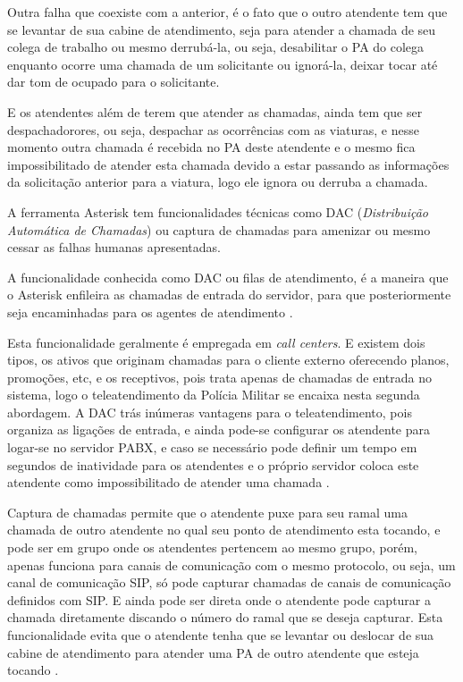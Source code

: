 Outra falha que coexiste com a anterior, é o fato que o outro atendente tem que se levantar de sua cabine de atendimento, seja para atender a chamada de seu colega de trabalho ou mesmo derrubá-la, ou seja, desabilitar o PA do colega enquanto ocorre uma chamada de um solicitante ou ignorá-la, deixar tocar até dar tom de ocupado para o solicitante.

E os atendentes além de terem que atender as chamadas, ainda tem que ser despachadorores, ou seja, despachar as ocorrências com as viaturas, e nesse momento outra chamada é recebida no PA deste atendente e o mesmo fica impossibilitado de atender esta chamada devido a estar passando as informações da solicitação anterior para a viatura, logo ele ignora ou derruba a chamada.

A ferramenta Asterisk tem funcionalidades técnicas como DAC (\textit{Distribuição Automática de Chamadas}) ou captura de chamadas para amenizar ou mesmo cessar as falhas humanas apresentadas.

A funcionalidade conhecida como DAC ou filas de atendimento, é a maneira que o Asterisk enfileira as chamadas de entrada do servidor, para que posteriormente seja encaminhadas para os agentes de atendimento \cite{flavioeduardoandredade2005}.

Esta funcionalidade geralmente é empregada em \textit{call centers}. E existem dois tipos, os ativos que originam chamadas para o cliente externo oferecendo planos, promoções, etc, e os receptivos, pois trata apenas de chamadas de entrada no sistema, logo o teleatendimento da Polícia Militar se encaixa nesta segunda abordagem. A DAC trás inúmeras vantagens para o teleatendimento, pois organiza as ligações de entrada, e ainda pode-se configurar os atendente para logar-se no servidor PABX, e caso se necessário pode definir um tempo em segundos de inatividade para os atendentes e o próprio servidor coloca este atendente como impossibilitado de atender uma chamada \cite{alexandrekeller2014}.

Captura de chamadas permite que o atendente puxe para seu ramal uma chamada de outro atendente no qual seu ponto de atendimento esta tocando, e pode ser em grupo onde os atendentes pertencem ao mesmo grupo, porém, apenas funciona para canais de comunicação com o mesmo protocolo, ou seja, um canal de comunicação SIP, só pode capturar chamadas de canais de comunicação definidos com SIP. E ainda pode ser direta onde o atendente pode capturar a chamada diretamente discando o número do ramal que se deseja capturar. Esta funcionalidade evita que o atendente tenha que se levantar ou deslocar de sua cabine de atendimento para atender uma PA de outro atendente que esteja tocando \cite{alexandrekeller2014}. 

